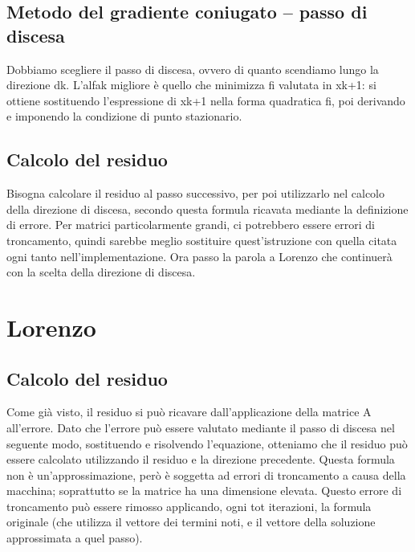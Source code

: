 \documentclass[a4paper]{article}
\begin{document}
\subsection*{Metodo del gradiente coniugato – passo di discesa}
Dobbiamo scegliere il passo di discesa, ovvero di quanto scendiamo lungo la direzione dk. L’alfak migliore è quello che minimizza fi valutata in xk+1: si ottiene sostituendo l’espressione di xk+1 nella forma quadratica fi, poi derivando e imponendo la condizione di punto stazionario.

\subsection*{Calcolo del residuo}
Bisogna calcolare il residuo al passo successivo, per poi utilizzarlo nel calcolo della direzione di discesa, secondo questa formula ricavata mediante la definizione di errore. Per matrici particolarmente grandi, ci potrebbero essere errori di troncamento, quindi sarebbe meglio sostituire quest’istruzione con quella citata ogni tanto nell’implementazione.
Ora passo la parola a Lorenzo che continuerà con la scelta della direzione di discesa.


\section*{Lorenzo}
\subsection*{Calcolo del residuo}
Come già visto, il residuo si può ricavare dall’applicazione della matrice A all’errore. Dato che l’errore può essere valutato mediante il passo di discesa nel seguente modo, sostituendo e risolvendo l’equazione, otteniamo che il residuo può essere calcolato utilizzando il residuo e la direzione precedente.
Questa formula non è un’approssimazione, però è soggetta ad errori di troncamento a causa della macchina; soprattutto se la matrice ha  una dimensione elevata. Questo errore di troncamento può essere rimosso applicando, ogni tot iterazioni, la formula originale (che utilizza il vettore dei termini noti, e il vettore della soluzione approssimata a quel passo).
\end{document}

